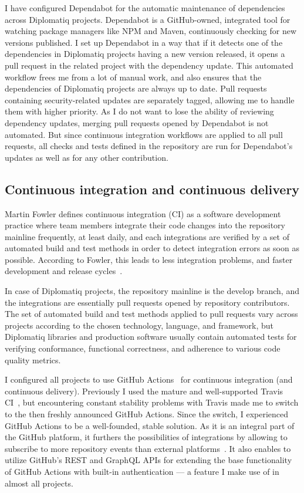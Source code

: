 I have configured Dependabot for the automatic maintenance of dependencies across Diplomatiq projects. Dependabot is a GitHub-owned, integrated tool for watching package managers like NPM and Maven, continuously checking for new versions published. I set up Dependabot in a way that if it detects one of the dependencies in Diplomatiq projects having a new version released, it opens a pull request in the related project with the dependency update. This automated workflow frees me from a lot of manual work, and also ensures that the dependencies of Diplomatiq projects are always up to date. Pull requests containing security-related updates are separately tagged, allowing me to handle them with higher priority. As I do not want to lose the ability of reviewing dependency updates, merging pull requests opened by Dependabot is not automated. But since continuous integration workflows are applied to all pull requests, all checks and tests defined in the repository are run for Dependabot's updates as well as for any other contribution.

\subsection{Continuous integration and continuous delivery}

Martin Fowler defines continuous integration (CI) as a software development practice where team members integrate their code changes into the repository mainline frequently, at least daily, and each integrations are verified by a set of automated build and test methods in order to detect integration errors as soon as possible. According to Fowler, this leads to less integration problems, and faster development and release cycles~\cite{fowler-ci}.

In case of Diplomatiq projects, the repository mainline is the develop branch, and the integrations are essentially pull requests opened by repository contributors. The set of automated build and test methods applied to pull requests vary across projects according to the chosen technology, language, and framework, but Diplomatiq libraries and production software usually contain automated tests for verifying conformance, functional correctness, and adherence to various code quality metrics.

I configured all projects to use GitHub Actions~\cite{githubactions} for continuous integration (and continuous delivery). Previously I used the mature and well-supported Travis CI~\cite{travisci}, but encountering constant stability problems with Travis made me to switch to the then freshly announced GitHub Actions. Since the switch, I experienced GitHub Actions to be a well-founded, stable solution. As it is an integral part of the GitHub platform, it furthers the possibilities of integrations by allowing to subscribe to more repository events than external platforms~\cite{actions-events}. It also enables to utilize GitHub's REST and GraphQL APIs for extending the base functionality of GitHub Actions with built-in authentication — a feature I make use of in almost all projects.

